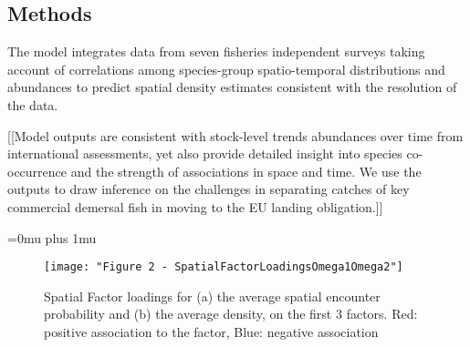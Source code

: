\documentclass{nature}
\begin{document}
\begin{linenumbers}
\section*{Methods}



The model integrates data from seven fisheries independent surveys taking
account of correlations among species-group spatio-temporal distributions and
abundances to predict spatial density estimates consistent with the resolution
of the data. 

[[Model outputs are consistent with stock-level trends abundances over time
from international assessments, yet also provide detailed insight into species
co-occurrence and the strength of associations in space and time.  We use the
outputs to draw inference on the challenges in separating catches of key
commercial demersal fish in moving to the EU landing obligation.]]



\end{linenumbers}
\newpage
\Urlmuskip=0mu plus 1mu\relax

\small{}






\begin{figure}
\begin{center}
	\texttt{[image: "Figure 2 - SpatialFactorLoadingsOmega1Omega2"]}
	\label{fig:1}
	\caption{Spatial Factor loadings for (a) the average spatial encounter
		probability and (b) the average density,  on the first 3
		factors. Red: positive association to the factor, Blue:
		negative association}
\end{center}
\end{figure}
\end{document}
